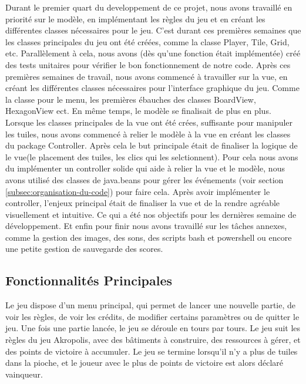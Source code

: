 \documentclass{article}
\begin{document}
    Durant le premier quart du developpement de ce projet, nous avons travaillé en priorité sur le modèle, en implémentant les règles du jeu et en créant les différentes classes nécessaires pour le jeu.
    C'est durant ces premières semaines que les classes principales du jeu ont été créées, comme la classe Player, Tile, Grid, etc.
    Parallèlement à cela, nous avons (dès qu'une fonction était implémentée) créé des tests unitaires pour vérifier le bon fonctionnement de notre code.
    Après ces premières semaines de travail, nous avons commencé à travailler sur la vue, en créant les différentes classes nécessaires pour l'interface graphique du jeu.
    Comme la classe pour le menu, les premières ébauches des classes BoardView, HexagonView ect.
    En même temps, le modèle se finalisait de plus en plus.
    Lorsque les classes principales de la vue ont été crées, suffisante pour manipuler les tuiles, nous avons commencé à relier le modèle à la vue en créant les classes du package Controller.
    Après cela le but principale était de finaliser la logique de le vue(le placement des tuiles, les clics qui les selctionnent).
    Pour cela nous avons du implémenter un controller solide qui aide à relier la vue et le modèle, nous avons utilisé des classes de java.beans pour gérer les événements (voir section \ref{subsec:organisation-du-code}) pour faire cela.
    Après avoir implémenter le controller, l'enjeux principal était de finaliser la vue et de la rendre agréable visuellement et intuitive.
    Ce qui a été nos objectifs pour les dernières semaine de développement.
    Et enfin pour finir nous avons travaillé sur les tâches annexes, comme la gestion des images, des sons, des scripts bash et powershell ou encore une petite gestion de sauvegarde des scores.

    \subsection{Fonctionnalités Principales}\label{subsec:fonctionnalites-principales}

    Le jeu dispose d'un menu principal, qui permet de lancer une nouvelle partie, de voir les règles, de voir les crédits, de modifier certains paramètres ou de quitter le jeu.
    Une fois une partie lancée, le jeu se déroule en tours par tours.
    Le jeu suit les règles du jeu Akropolis, avec des bâtiments à construire, des ressources à gérer, et des points de victoire à accumuler.
    Le jeu se termine lorsqu'il n'y a plus de tuiles dans la pioche, et le joueur avec le plus de points de victoire est alors déclaré vainqueur.
\end{document}
